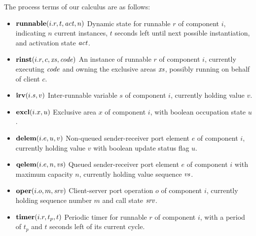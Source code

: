 \documentclass[10pt,conference]{IEEEtran}
\begin{document}
The process terms of our calculus are as follows:
\begin{itemize}
\item $\Trunnable {i.r} t \Act n$  \newline
Dynamic state for runnable $r$ of component $i$, indicating $n$ current instances, $t$ seconds left until next possible instantiation, and activation state $\Act$.
\item $\Trinst {i.r} c \Xs \Code$ \newline
An instance of runnable $r$ of component $i$, currently executing $\Code$ and owning the exclusive areas $\Xs$, possibly running on behalf of client $c$.
\item $\textbf{irv}(i.s,v)$ \newline
Inter-runnable variable $s$ of component $i$, currently holding value $v$.
\item $\textbf{excl}(i.x,u)$ \newline
Exclusive area $x$ of component $i$, with boolean occupation state $u$.
\item $\textbf{delem}(i.e,u,v)$ \newline
Non-queued sender-receiver port element $e$ of component $i$, currently holding value $v$ with boolean update status flag $u$.
\item $\Tqelem {i.e} n \Vs$ \newline
Queued sender-receiver port element $e$ of component $i$ with maximum capacity $n$, currently holding value sequence $\Vs$.
\item $\Toper {i.o} m \Srv$ \newline
Client-server port operation $o$ of component $i$, currently holding sequence number $m$ and call state $\Srv$.
\item $\textbf{timer}(i.r,t_p,t)$ \newline
Periodic timer for runnable $r$ of component $i$, with a period of $t_p$ and $t$ seconds left of its current cycle.
\end{itemize}
\end{document}

